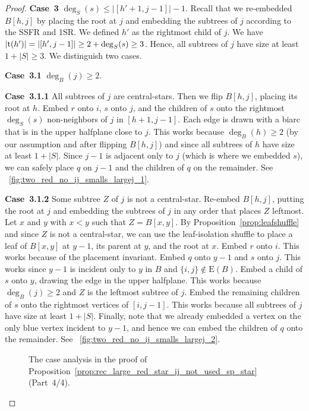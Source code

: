 \documentclass[11pt,a4paper,colorlinks=true,urlcolor=blue,citecolor=red]{article}
\theoremstyle{plain}
\newcommand{\case}[1]{\par\vspace{.5\baselineskip}\noindent\textbf{\sffamily Case~#1}}
\newcommand{\EB}{\mathrm{E}(B)}
\begin{document}
\begin{proof}
  \case{3} $\deg_S(s)\leq|[h'+1,j-1]|-1$. Recall that we re-embedded
  $B[h,j]$ by placing the root at $j$ and embedding the subtrees of $j$
  according to the SSFR and 1SR. We defined $h'$ as the rightmost child
  of $j$. We have $|\mathrm t(h')|=|[h',j-1]|\geq 2+\deg_S(s)\geq 3$. Hence, all
  subtrees of $j$ have size at least $1+|S|\geq 3$. We distinguish two
  cases.

  \case{3.1} $\deg_B(j)\geq 2$.

  \case{3.1.1} All subtrees of $j$ are central-stars. Then we flip
  $B[h,j]$, placing its root at $h$. Embed $r$ onto $i$, $s$ onto $j$,
  and the children of $s$ onto the rightmost $\deg_S(s)$ non-neighbors
  of $j$ in $[h+1,j-1]$. Each edge is drawn with a biarc that is in the
  upper halfplane close to $j$. This works because $\deg_B(h)\geq2$ (by
  our assumption and after flipping $B[h,j]$) and since all subtrees of
  $h$ have size at least $1+|S|$. Since $j-1$ is adjacent only to $j$
  (which is where we embedded $s$), we can safely place $q$ on $j-1$ and
  the children of $q$ on the remainder. See
  \figurename~\ref{fig:two_red_no_ij_smalls_largej_1}.

  \case{3.1.2} Some subtree $Z$ of $j$ is not a central-star. Re-embed
  $B[h,j]$, putting the root at $j$ and embedding the subtrees of $j$ in
  any order that places $Z$ leftmost. Let $x$ and $y$ with $x<y$ such
  that $Z=B[x,y]$. By Proposition~\ref{prop:leafshuffle} and since $Z$
  is not a central-star, we can use the leaf-isolation shuffle to place
  a leaf of $B[x,y]$ at $y-1$, its parent at $y$, and the root at $x$.
  Embed $r$ onto $i$. This works because of the placement invariant.
  Embed $q$ onto $y-1$ and $s$ onto $j$. This works since $y-1$ is
  incident only to $y$ in $B$ and $\{i,j\}\not\in\EB$. Embed a
  child of $s$ onto $y$, drawing the edge in the upper halfplane. This
  works because $\deg_B(j)\geq 2$ and $Z$ is the leftmost subtree of
  $j$. Embed the remaining children of $s$ onto the rightmost vertices
  of $[i,j-1]$. This works because all subtrees of $j$ have size at
  least $1+|S|$. Finally, note that we already embedded a vertex on the
  only blue vertex incident to $y-1$, and hence we can embed the
  children of $q$ onto the remainder. See
  \figurename~\ref{fig:two_red_no_ij_smalls_largej_2}.

  \begin{figure}
    \centering\hfil {}\hfil {}\hfil {}\hfil {}\hfil \label{fig:two_red_no_ij_4}
    \caption{The case analysis in the proof of
      Proposition~\ref{prop:rec_large_red_star_ij_not_used_sp_star}
      (Part~4/4).}
  \end{figure}



\end{proof}
\end{document}
